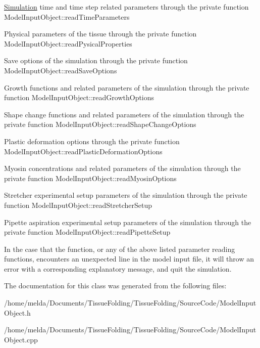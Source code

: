 \hyperlink{classSimulation}{Simulation} time and time step related parameters through the private function Model\+Input\+Object\+::read\+Time\+Parameters

Physical parameters of the tissue through the private function Model\+Input\+Object\+::read\+Pysical\+Properties

Save options of the simulation through the private function Model\+Input\+Object\+::read\+Save\+Options

Growth functions and related parameters of the simulation through the private function Model\+Input\+Object\+::read\+Growth\+Options

Shape change functions and related parameters of the simulation through the private function Model\+Input\+Object\+::read\+Shape\+Change\+Options

Plastic deformation options through the private function Model\+Input\+Object\+::read\+Plastic\+Deformation\+Options

Myosin concentrations and related parameters of the simulation through the private function Model\+Input\+Object\+::read\+Myosin\+Options

Stretcher experimental setup parameters of the simulation through the private function Model\+Input\+Object\+::read\+Stretcher\+Setup

Pipette aspiration experimental setup parameters of the simulation through the private function Model\+Input\+Object\+::read\+Pipette\+Setup

In the case that the function, or any of the above listed parameter reading functions, encounters an unexpected line in the model input file, it will throw an error with a corresponding explanatory message, and quit the simulation.

The documentation for this class was generated from the following files\+:\begin{DoxyCompactItemize}
\item 
/home/melda/\+Documents/\+Tissue\+Folding/\+Tissue\+Folding/\+Source\+Code/Model\+Input\+Object.\+h\item 
/home/melda/\+Documents/\+Tissue\+Folding/\+Tissue\+Folding/\+Source\+Code/Model\+Input\+Object.\+cpp\end{DoxyCompactItemize}
